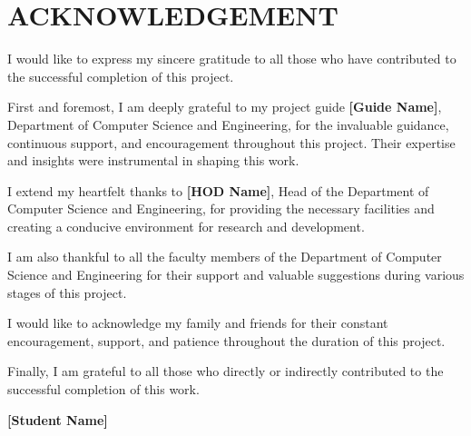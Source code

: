 \documentclass[12pt,a4paper]{report}
\begin{document}
\newpage

\chapter*{ACKNOWLEDGEMENT}

\vspace{1cm}

\justify
I would like to express my sincere gratitude to all those who have contributed to the successful completion of this project.

\vspace{0.5cm}

First and foremost, I am deeply grateful to my project guide \textbf{[Guide Name]}, Department of Computer Science and Engineering, for the invaluable guidance, continuous support, and encouragement throughout this project. Their expertise and insights were instrumental in shaping this work.

\vspace{0.5cm}

I extend my heartfelt thanks to \textbf{[HOD Name]}, Head of the Department of Computer Science and Engineering, for providing the necessary facilities and creating a conducive environment for research and development.

\vspace{0.5cm}

I am also thankful to all the faculty members of the Department of Computer Science and Engineering for their support and valuable suggestions during various stages of this project.

\vspace{0.5cm}

I would like to acknowledge my family and friends for their constant encouragement, support, and patience throughout the duration of this project.

\vspace{0.5cm}

Finally, I am grateful to all those who directly or indirectly contributed to the successful completion of this work.

\vspace{3cm}

\begin{flushright}
\textbf{[Student Name]}
\end{flushright}

\newpage

\end{document}
